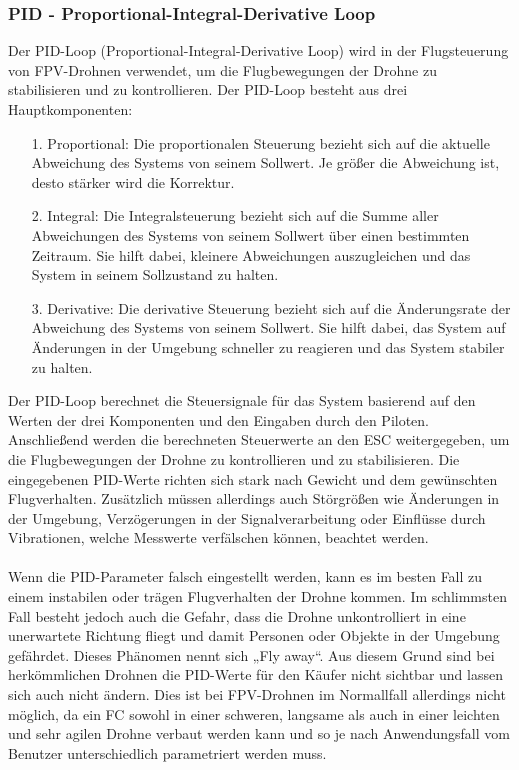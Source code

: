 \subsubsection[PID - Proportional-Integral-Derivative Loop]{PID - Proportional-Integral-Derivative Loop}
    Der PID-Loop (Proportional-Integral-Derivative Loop) wird in der Flugsteuerung von FPV-Drohnen verwendet, um die Flugbewegungen der Drohne zu stabilisieren und zu kontrollieren. Der PID-Loop besteht aus drei Hauptkomponenten:

    \begin{itemize}
        \item[1.] Proportional: Die proportionalen Steuerung bezieht sich auf die aktuelle Abweichung des Systems von seinem Sollwert. Je größer die Abweichung ist, desto stärker wird die Korrektur.
        \item[2.] Integral: Die Integralsteuerung bezieht sich auf die Summe aller Abweichungen des Systems von seinem Sollwert über einen bestimmten Zeitraum. Sie hilft dabei, kleinere Abweichungen auszugleichen und das System in seinem Sollzustand zu halten.
        \item[3.] Derivative: Die derivative Steuerung bezieht sich auf die Änderungsrate der Abweichung des Systems von seinem Sollwert. Sie hilft dabei, das System auf Änderungen in der Umgebung schneller zu reagieren und das System stabiler zu halten.
     \end{itemize}

     Der PID-Loop berechnet die Steuersignale für das System basierend auf den Werten der drei Komponenten und den Eingaben durch den Piloten. Anschließend werden die berechneten Steuerwerte an den ESC weitergegeben, um die Flugbewegungen der Drohne zu kontrollieren und zu stabilisieren. Die eingegebenen PID-Werte richten sich stark nach Gewicht und dem gewünschten Flugverhalten. Zusätzlich müssen allerdings auch Störgrößen wie Änderungen in der Umgebung, Verzögerungen in der Signalverarbeitung oder Einflüsse durch Vibrationen, welche Messwerte verfälschen können, beachtet werden.
     \\ \\
     Wenn die PID-Parameter falsch eingestellt werden, kann es im besten Fall zu einem instabilen oder trägen Flugverhalten der Drohne kommen. Im schlimmsten Fall besteht jedoch auch die Gefahr, dass die Drohne unkontrolliert in eine unerwartete Richtung fliegt und damit Personen oder Objekte in der Umgebung gefährdet. Dieses Phänomen nennt sich „Fly away“. Aus diesem Grund sind bei herkömmlichen Drohnen die PID-Werte für den Käufer nicht sichtbar und lassen sich auch nicht ändern. Dies ist bei FPV-Drohnen im Normallfall allerdings nicht möglich, da ein FC sowohl in einer schweren, langsame als auch in einer leichten und sehr agilen Drohne verbaut werden kann und so je nach Anwendungsfall vom Benutzer unterschiedlich parametriert werden muss.

